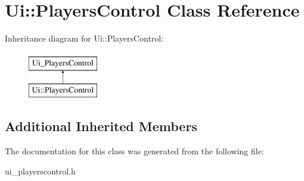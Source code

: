 \hypertarget{classUi_1_1PlayersControl}{\section{Ui\-:\-:Players\-Control Class Reference}
\label{classUi_1_1PlayersControl}
}
Inheritance diagram for Ui\-:\-:Players\-Control\-:\begin{figure}[H]
\begin{center}
\leavevmode
\includegraphics[height=2.000000cm]{classUi_1_1PlayersControl}
\end{center}
\end{figure}
\subsection*{Additional Inherited Members}


The documentation for this class was generated from the following file\-:\begin{DoxyCompactItemize}
\item 
ui\-\_\-playerscontrol.\-h\end{DoxyCompactItemize}
